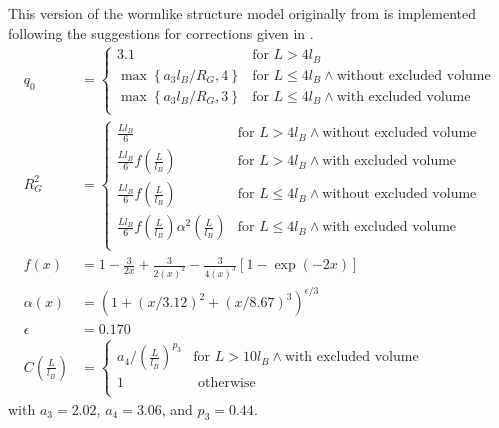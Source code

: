 This version of the wormlike structure model originally from \cite{Pedersen96Macrom} is implemented following the suggestions for corrections given in \cite{Chen2006}. 
\begin{align}
q_0 &=
\begin{cases}
3.1 & \mbox{for~} L>4l_B \\
\max\left\{a_3 l_B/R_G,4\right\} & \mbox{for~} L\leq 4l_B \wedge \mbox{without excluded volume}\\
\max\left\{a_3 l_B/R_G,3\right\} & \mbox{for~} L\leq 4l_B \wedge \mbox{with excluded volume}\\
\end{cases} \\
R_G^2 &=
\begin{cases}
\frac{Ll_B}{6} & \mbox{for~} L > 4l_B \wedge \mbox{without excluded volume} \\
\frac{Ll_B}{6} f\left(\frac{L}{l_B}\right) & \mbox{for~} L > 4l_B \wedge \mbox{with excluded volume} \\
\frac{Ll_B}{6} f\left(\frac{L}{l_B}\right)& \mbox{for~} L\leq 4l_B \wedge \mbox{without excluded volume}\\
\frac{Ll_B}{6} f\left(\frac{L}{l_B}\right)\alpha^2\left(\frac{L}{l_B}\right) & \mbox{for~} L\leq 4l_B \wedge \mbox{with excluded volume}\\
\end{cases} \\
f(x) &= 1-\frac{3}{2x}+\frac{3}{2\left(x\right)^2}-\frac{3}{4\left(x\right)^3}\left[1-\exp\left(-2x\right)\right]\\
\alpha(x) &= \left(1+(x/3.12)^2+(x/8.67)^3\right)^{\epsilon/3} \\
\epsilon&=0.170 \\
C\left(\frac{L}{l_B}\right) &=
\begin{cases}
a_4/\left(\frac{L}{l_B}\right)^{p_3} & \mbox{for~} L > 10l_B \wedge \mbox{with excluded volume} \\
1 & \mbox{ otherwise}\\
\end{cases}
\end{align}
with  $a_3=2.02$, $a_4=3.06$, and $p_3=0.44$.
